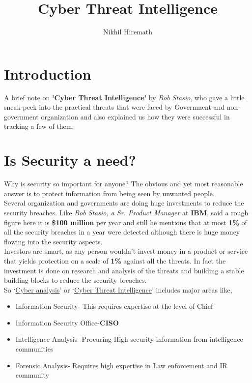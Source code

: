 \documentclass{article}
\title{Cyber Threat Intelligence}
\author{Nikhil Hiremath}
\begin{document}
\maketitle

\section*{Introduction}
A brief note on \textbf{'Cyber Threat Intelligence'} by \textit{Bob Stasio}, who gave a little sneak-peek into the practical threats that were faced by Government and non-government organization and also explained us how they were successful in tracking a few of them.

\section*{Is Security a need?}
Why is security so important for anyone? The obvious and yet most reasonable answer is to protect information from being seen by unwanted people.\\

Several organization and governments are doing huge investments to reduce the security breaches. Like \textit{Bob Stasio, a Sr. Product Manager} at \textbf{IBM}, said  a rough figure here it is \textbf{\$100 million} per year and still he mentions that at most \textbf{1\%} of all the security breaches in a year 
were detected although there is huge money flowing into the security aspects.\\

Investors are smart, as any person wouldn't invest money in a product or service that yields protection on a scale of \textbf{1\%} against all the threats. In fact the investment is done on research and analysis of the threats and building a stable building blocks to reduce the security breaches.\\
So `\underline{Cyber analysis}' or `\underline{Cyber Threat Intelligence}' includes major areas like,\\
\begin{itemize}
\item Information Security- This requires expertise at the level of Chief
\item Information Security Office-\textbf{CISO}
\item Intelligence Analysis- Procuring High security information from intelligence communities
\item Forensic Analysis- Requires high expertise in Law enforcement and IR community
\end{itemize}
\end{document}

